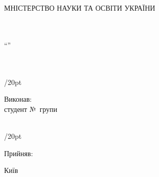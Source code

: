 \thispagestyle{empty}
{ \sffamily
\begin{center}
	\LARGE{МНІСТЕРСТВО НАУКИ ТА ОСВІТИ УКРАЇНИ}\\
	\LARGE{\university}\\
	\Large{\faculty}\\
	\Large{\department}
\end{center}

\vspace*{\fill}

\begin{center}
	\Large
	``\subjectname''\\
	\prodname\ \prodnumber\\
	\proddate\\
\end{center}
\vspace*{\fill}
\begin{adjustwidth}{\textwidth/2}{0pt}
	\begin{flushleft}
		\large
		Виконав:\\
		студент №\studentnumber\ групи \shortdepartment\ \groupnumber\ \shortuniversity\\
		\studentname\\
	\end{flushleft}
\end{adjustwidth}

\vspace{1cm}

\begin{adjustwidth}{\textwidth/2}{0pt}
	\begin{flushleft}
		\large
		Прийняв:\\
		\teacher
	\end{flushleft}
\end{adjustwidth}
}

\vspace*{\fill}

\begin{center}
	Київ \the\year
\end{center}

\newpage